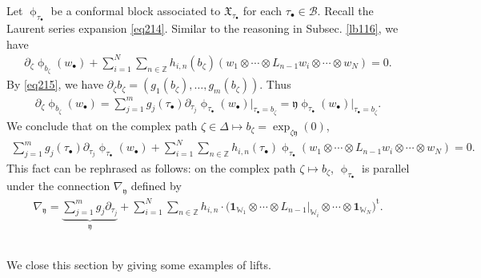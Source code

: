 \documentclass[12pt,a4paper,notitlepage]{article}
\theoremstyle{definition}
\theoremstyle{plain}
\newcommand{\fk}{\mathfrak}
\newcommand{\mc}{\mathcal}
\newcommand{\tr}{\mathrm{t}} %
\newcommand{\id}{\mathbf{1}}
\newcommand{\yk}{\mathfrak y}
\newcommand{\blt}{\bullet}
\newcommand{\Wbb}{\mathbb W}
\newcommand{\Zbb}{\mathbb Z}
\numberwithin{equation}{section}
\begin{document}
Let $\upphi_{\tau_\blt}$ be a conformal block associated to $\fk X_{\tau_\blt}$ for each $\tau_\blt\in\mc B$. Recall the Laurent series expansion \eqref{eq214}. Similar to the reasoning in Subsec. \ref{lb116}, we have
\begin{align}
\partial_\zeta\upphi_{b_\zeta}(w_\blt)+\sum_{i=1}^N\sum_{n\in\Zbb}h_{i,n}(b_\zeta)(w_1\otimes\cdots\otimes L_{n-1}w_i\otimes\cdots\otimes w_N)=0.
\end{align}
By \eqref{eq215}, we have $\partial_\zeta b_\zeta=(g_1(b_\zeta),\dots,g_m(b_\zeta))$. Thus
\begin{align*}
\partial_\zeta\upphi_{b_\zeta}(w_\blt)=\sum_{j=1}^m g_j(\tau_\blt)\partial_{\tau_j}\upphi_{\tau_\blt}(w_\blt)\big|_{\tau_\blt=b_\zeta}=\yk\upphi_{\tau_\blt}(w_\blt)\big|_{\tau_\blt=b_\zeta}.
\end{align*}
We conclude that on the complex path $\zeta\in\Delta\mapsto b_\zeta=\exp_{\zeta\yk}(0)$,
\begin{align}
\sum_{j=1}^m g_j(\tau_\blt)\partial_{\tau_j}\upphi_{\tau_\blt}(w_\blt)+ \sum_{i=1}^N\sum_{n\in\Zbb}h_{i,n}(\tau_\blt)\upphi_{\tau_\blt}(w_1\otimes\cdots\otimes L_{n-1}w_i\otimes\cdots\otimes w_N)=0.
\end{align}
This fact can be rephrased as follows: on the complex path $\zeta\mapsto b_\zeta$, $\upphi_{\tau_\blt}$ is parallel under the connection $\nabla_\yk$ defined by
\begin{align}
\nabla_{\yk}=\underbrace{\sum_{j=1}^m g_j\partial_{\tau_j}}_{\yk}+\sum_{i=1}^N\sum_{n\in\Zbb} h_{i,n}\cdot\big(\id_{\Wbb_1}\otimes\cdots\otimes L_{n-1}\big|_{\Wbb_i}\otimes\cdots\otimes\id_{\Wbb_N}\big)^\tr.\label{eq217}
\end{align}


\subsection{}

We close this section by giving some examples of lifts. 
\end{document}
